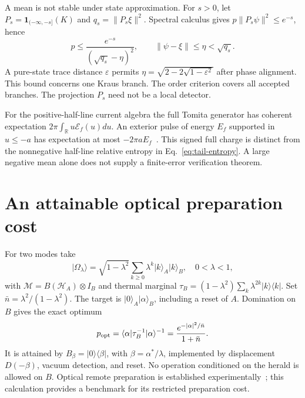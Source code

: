 \documentclass[11pt,a4paper]{article}
\newcommand{\M}{\mathcal M}
\newcommand{\HH}{\mathcal H}
\newcommand{\ket}[1]{\lvert #1\rangle}
\newcommand{\bra}[1]{\langle #1\rvert}
\newcommand{\norm}[1]{\lVert #1\rVert}
\begin{document}
A mean is not stable under state approximation. For $s>0$, let
$P_s=\mathbf1_{(-\infty,-s]}(K)$ and $q_s=\norm{P_s\xi}^2$.
Spectral calculus gives $p\norm{P_s\psi}^2\le e^{-s}$, hence
\begin{equation}
p\le\frac{e^{-s}}{(\sqrt{q_s}-\eta)^2},\qquad
\norm{\psi-\xi}\le\eta<\sqrt{q_s}.
\label{eq:spectral}
\end{equation}
A pure-state trace distance $\varepsilon$ permits
$\eta=\sqrt{2-2\sqrt{1-\varepsilon^2}}$ after phase alignment.
This bound concerns one Kraus branch. The order criterion covers all
accepted branches. The projection $P_s$ need not be a local detector.

For the positive-half-line current algebra the full Tomita generator has
coherent expectation $2\pi\int_{\mathbb R}u\mathcal E_f(u)du$.
An exterior pulse of energy $E_f$ supported in $u\le-a$ has expectation
at most $-2\pi aE_f$~\cite{brunetti1993modular}.
This signed full charge is distinct from the nonnegative half-line
relative entropy in Eq.~\eqref{eq:tail-entropy}. A large negative mean
alone does not supply a finite-error verification theorem.

\section{An attainable optical preparation cost}
\label{app:optical}

For two modes take
\begin{equation}
\ket{\Omega_\lambda}=\sqrt{1-\lambda^2}
\sum_{k\ge0}\lambda^k\ket{k}_A\ket{k}_B,\quad 0<\lambda<1,
\end{equation}
with $\M=B(\HH_A)\otimes I_B$ and thermal marginal
$\tau_B=(1-\lambda^2)\sum_k\lambda^{2k}\ket k\bra k$.
Set $\bar n=\lambda^2/(1-\lambda^2)$. The target is
$\ket0_A\ket\alpha_B$, including a reset of $A$.
Domination on $B$ gives the exact optimum
\begin{equation}
p_{\rm opt}=\langle\alpha|\tau_B^{-1}|\alpha\rangle^{-1}
=\frac{e^{-|\alpha|^2/\bar n}}{1+\bar n}.
\end{equation}
It is attained by $B_\beta=\ket0\bra\beta$, with
$\beta=\alpha^*/\lambda$, implemented by displacement $D(-\beta)$,
vacuum detection, and reset. No operation conditioned on the herald is
allowed on $B$. Optical remote preparation is established
experimentally~\cite{han2023remote}; this calculation provides a benchmark
for its restricted preparation cost.
\end{document}
